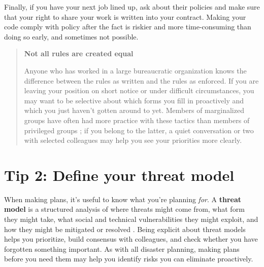\documentclass[10pt,letterpaper]{article}
\begin{document}
Finally,
if you have your next job lined up,
ask about their policies
and make sure that your right to share your work is written into your contract.
Making your code comply with policy after the fact is riskier and more time-consuming than doing so early,
and sometimes not possible.

\begin{quote}
  \noindent
  \textbf{Not all rules are created equal}

  Anyone who has worked in a large bureaucratic organization knows
  the difference between the rules as written and the rules as enforced.
  If you are leaving your position on short notice or under difficult circumstances,
  you may want to be selective about which forms you fill in proactively
  and which you just haven't gotten around to yet.
  Members of marginalized groups have often had more practice with these tactics
  than members of privileged groups \cite{Scott1987};
  if you belong to the latter,
  a quiet conversation or two with selected colleagues may help you see your priorities more clearly.
\end{quote}

\section*{Tip 2: Define your threat model}

When making plans, it's useful to know what you're planning \emph{for}.
A \textbf{threat model} is a structured analysis of where threats might come from,
what form they might take,
what social and technical vulnerabilities they might exploit,
and how they might be mitigated or resolved \cite{Torr2005}.
Being explicit about threat models helps you prioritize,
build consensus with colleagues,
and check whether you have forgotten something important.
As with all disaster planning,
making plans before you need them may help you identify risks you can eliminate proactively.
\end{document}

